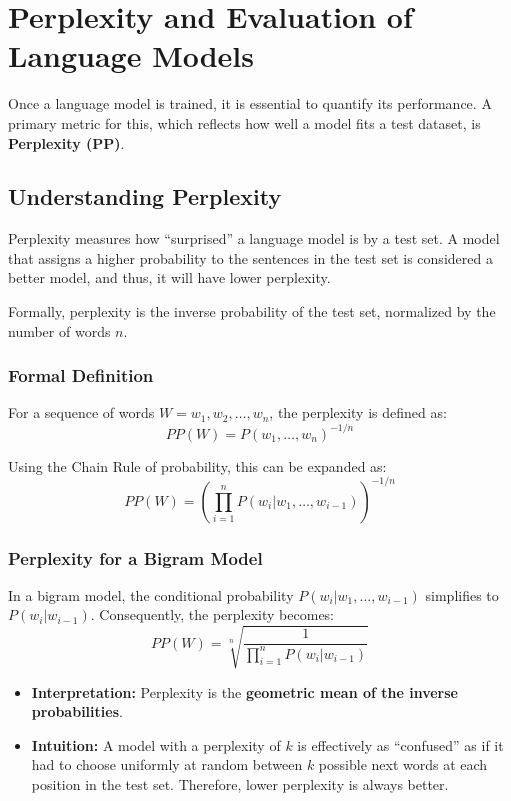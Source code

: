 \documentclass[
  italian,
  11pt,
]{article}
\providecommand{\tightlist}{%
  \setlength{\itemsep}{0pt}\setlength{\parskip}{0pt}}
\begin{document}
\newpage

\section{Perplexity and Evaluation of Language
Models}\label{perplexity-and-evaluation-of-language-models}

Once a language model is trained, it is essential to quantify its
performance. A primary metric for this, which reflects how well a model
fits a test dataset, is \textbf{Perplexity (PP)}.

\subsection{Understanding Perplexity}\label{understanding-perplexity}

Perplexity measures how ``surprised'' a language model is by a test set.
A model that assigns a higher probability to the sentences in the test
set is considered a better model, and thus, it will have lower
perplexity.

Formally, perplexity is the inverse probability of the test set,
normalized by the number of words \(n\).

\subsubsection{Formal Definition}\label{formal-definition}

For a sequence of words \(W = w_1, w_2, \dots, w_n\), the perplexity is
defined as: \[PP(W) = P(w_1, \dots, w_n)^{-1/n}\]

Using the Chain Rule of probability, this can be expanded as:
\[PP(W) = \left( \prod_{i=1}^{n} P(w_i | w_1, \dots, w_{i-1}) \right)^{-1/n}\]

\subsubsection{Perplexity for a Bigram
Model}\label{perplexity-for-a-bigram-model}

In a bigram model, the conditional probability
\(P(w_i | w_1, \dots, w_{i-1})\) simplifies to \(P(w_i | w_{i-1})\).
Consequently, the perplexity becomes:
\[PP(W) = \sqrt[n]{\frac{1}{\prod_{i=1}^{n} P(w_i | w_{i-1})}}\]

\begin{itemize}
\tightlist
\item
  \textbf{Interpretation:} Perplexity is the \textbf{geometric mean of
  the inverse probabilities}.
\item
  \textbf{Intuition:} A model with a perplexity of \(k\) is effectively
  as ``confused'' as if it had to choose uniformly at random between
  \(k\) possible next words at each position in the test set. Therefore,
  lower perplexity is always better.
\end{itemize}
\end{document}

